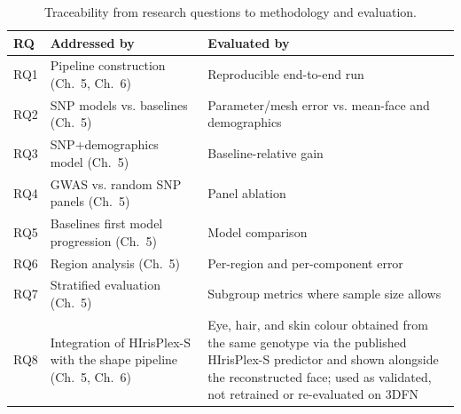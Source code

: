 \begin{table}[!h]
\centering
\caption{Traceability from research questions to methodology and evaluation.}
\label{tab:trace}
\small
\begin{tabular}{|P{1.5cm}|P{6.0cm}|P{5.8cm}|}
\hline
\textbf{RQ} & \textbf{Addressed by} & \textbf{Evaluated by} \\ \hline
RQ1 & Pipeline construction (Ch.~5, Ch.~6) & Reproducible end-to-end run \\ \hline
RQ2 & SNP models vs. baselines (Ch.~5) & Parameter/mesh error vs. mean-face and demographics \\ \hline
RQ3 & SNP+demographics model (Ch.~5) & Baseline-relative gain \\ \hline
RQ4 & GWAS vs. random SNP panels (Ch.~5) & Panel ablation \\ \hline
RQ5 & Baselines first model progression (Ch.~5) & Model comparison \\ \hline
RQ6 & Region analysis (Ch.~5) & Per-region and per-component error \\ \hline
RQ7 & Stratified evaluation (Ch.~5) & Subgroup metrics where sample size allows \\ \hline
RQ8 & Integration of HIrisPlex-S with the shape pipeline (Ch.~5, Ch.~6) & Eye, hair, and skin colour obtained from the same genotype via the published HIrisPlex-S predictor and shown alongside the reconstructed face; used as validated, not retrained or re-evaluated on 3DFN \\ \hline
\end{tabular}
\end{table}
